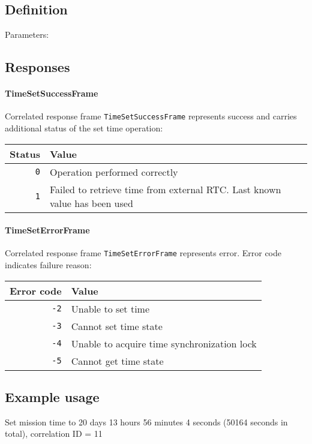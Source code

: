 \subsection{Definition}

Parameters: 

\begin{tcarglist}
\end{tcarglist}


\subsection{Responses}

\paragraph{TimeSetSuccessFrame}
Correlated response frame \texttt{TimeSetSuccessFrame} represents success and carries additional status of the set time operation:

\begin{tabular}{r | l}
	Status & Value \\
	\hline
	\texttt{0} & Operation performed correctly \\	
	\texttt{1} & Failed to retrieve time from external RTC. Last known value has been used \\
\end{tabular}

\paragraph{TimeSetErrorFrame}
Correlated response frame \texttt{TimeSetErrorFrame} represents error. Error code indicates failure reason:

\begin{tabular}{r | l}
	Error code & Value \\
	\hline
	\texttt{-2} & Unable to set time \\	
	\texttt{-3} & Cannot set time state \\	
	\texttt{-4} & Unable to acquire time synchronization lock \\
	\texttt{-5} & Cannot get time state \\
\end{tabular}



\subsection{Example usage}
Set mission time to 20 days 13 hours 56 minutes 4 seconds (50164 seconds in total), correlation ID = 11
